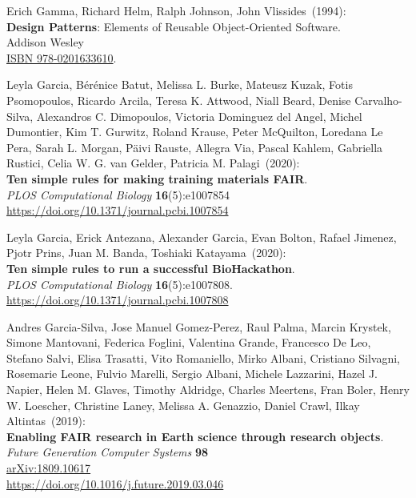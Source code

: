 \begin{thebibliography}{9}
Erich Gamma, Richard Helm, Ralph Johnson, John Vlissides~(1994):\\
\textbf{Design Patterns}: Elements of Reusable Object-Oriented Software. \\
Addison Wesley \\ 
\href{https://identifiers.org/isbn/9780201633610}{ISBN 978-0201633610}.

Leyla Garcia, Bérénice Batut, Melissa L. Burke, Mateusz Kuzak, Fotis Psomopoulos, Ricardo Arcila, Teresa K. Attwood, Niall Beard, Denise Carvalho-Silva, Alexandros C. Dimopoulos, Victoria Dominguez del Angel, Michel Dumontier, Kim T. Gurwitz, Roland Krause, Peter McQuilton, Loredana Le Pera, Sarah L. Morgan, Päivi Rauste, Allegra Via, Pascal Kahlem, Gabriella Rustici, Celia W. G. van Gelder, Patricia M. Palagi~(2020): \\
\textbf{Ten simple rules for making training materials FAIR}.\\
\emph{PLOS Computational Biology} \textbf{16}(5):e1007854 \\
\url{https://doi.org/10.1371/journal.pcbi.1007854}

Leyla Garcia, Erick Antezana, Alexander Garcia, Evan Bolton, Rafael Jimenez, Pjotr Prins, Juan M. Banda, Toshiaki Katayama~(2020): \\
\textbf{Ten simple rules to run a successful BioHackathon}. \\
\emph{PLOS Computational Biology} \textbf{16}(5):e1007808.\\
\url{https://doi.org/10.1371/journal.pcbi.1007808}

Andres Garcia-Silva, Jose Manuel Gomez-Perez, Raul Palma, Marcin Krystek, Simone Mantovani, Federica Foglini, Valentina Grande, Francesco De Leo, Stefano Salvi, Elisa Trasatti, Vito Romaniello, Mirko Albani, Cristiano Silvagni, Rosemarie Leone, Fulvio Marelli, Sergio Albani, Michele Lazzarini, Hazel J. Napier, Helen M. Glaves, Timothy Aldridge, Charles Meertens, Fran Boler, Henry W. Loescher, Christine Laney, Melissa A. Genazzio, Daniel Crawl, Ilkay Altintas~(2019): \\
\textbf{Enabling FAIR research in Earth science through research objects}.\\
\emph{Future Generation Computer Systems} \textbf{98} \\
\href{https://doi.org/10.48550/arXiv.1809.10617}{arXiv:1809.10617} \\
\url{https://doi.org/10.1016/j.future.2019.03.046}


\end{thebibliography}
